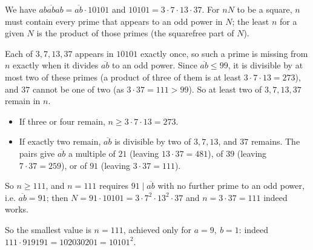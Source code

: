 We have $\overline{ababab}=\overline{ab}\cdot10101$ and $10101=3\cdot7\cdot13\cdot37$. For $nN$ to be a square, $n$ must contain every prime that appears to an odd power in $N$; the least $n$ for a given $N$ is the product of those primes (the squarefree part of $N$).

Each of $3,7,13,37$ appears in $10101$ exactly once, so such a prime is missing from $n$ exactly when it divides $\overline{ab}$ to an odd power. Since $\overline{ab}\le99$, it is divisible by at most two of these primes (a product of three of them is at least $3\cdot7\cdot13=273$), and $37$ cannot be one of two (as $3\cdot37=111>99$). So at least two of $3,7,13,37$ remain in $n$.
\begin{itemize}
\item If three or four remain, $n\ge3\cdot7\cdot13=273$.
\item If exactly two remain, $\overline{ab}$ is divisible by two of $3,7,13$, and $37$ remains. The pairs give $\overline{ab}$ a multiple of $21$ (leaving $13\cdot37=481$), of $39$ (leaving $7\cdot37=259$), or of $91$ (leaving $3\cdot37=111$).
\end{itemize}
So $n\ge111$, and $n=111$ requires $91\mid\overline{ab}$ with no further prime to an odd power, i.e. $\overline{ab}=91$; then $N=91\cdot10101=3\cdot7^2\cdot13^2\cdot37$ and $n=3\cdot37=111$ indeed works.

So the smallest value is $\boxed{n=111}$, achieved only for $\boxed{a=9,\ b=1}$: indeed $111\cdot919191=102030201=10101^2$.
